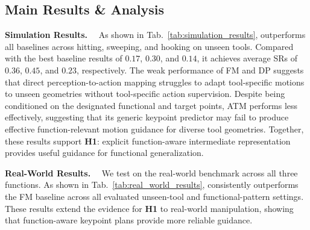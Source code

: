 \subsection{Main Results \& Analysis}

\textbf{Simulation Results.}~~
As shown in Tab.~\ref{tab:simulation_results}, \algoname{} outperforms all baselines across hitting, sweeping, and hooking on unseen tools.
Compared with the best baseline results of $0.17$, $0.30$, and $0.14$, it achieves average SRs of $0.36$, $0.45$, and $0.23$, respectively.
The weak performance of FM and DP suggests that direct perception-to-action mapping struggles to adapt tool-specific motions to unseen geometries without tool-specific action supervision.
Despite being conditioned on the designated functional and target points, ATM performs less effectively, suggesting that its generic keypoint predictor may fail to produce effective function-relevant motion guidance for diverse tool geometries.
Together, these results support \textbf{H1}: explicit function-aware intermediate representation provides useful guidance for functional generalization.


\textbf{Real-World Results.}~~
We test \algoname{} on the real-world benchmark across all three functions.
As shown in Tab.~\ref{tab:real_world_results}, \algoname{} consistently outperforms the FM baseline across all evaluated unseen-tool and functional-pattern settings. These results extend the evidence for \textbf{H1} to real-world manipulation, showing that function-aware keypoint plans provide more reliable guidance.

